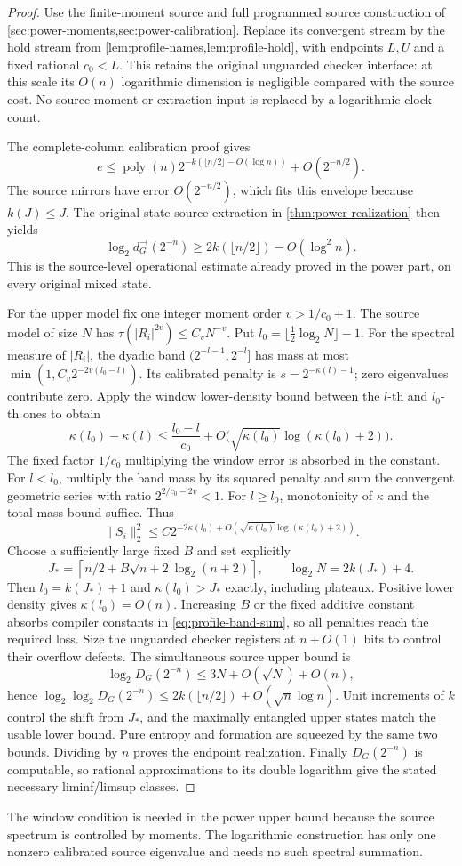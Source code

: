\begin{proof}
Use the finite-moment source and full programmed source construction of \cref{sec:power-moments,sec:power-calibration}. Replace its convergent stream by the hold stream from \cref{lem:profile-names,lem:profile-hold}, with endpoints $L,U$ and a fixed rational $c_0<L$. This retains the original unguarded checker interface: at this scale its $O(n)$ logarithmic dimension is negligible compared with the source cost. No source-moment or extraction input is replaced by a logarithmic clock count.

The complete-column calibration proof gives
\[
 e\le\operatorname{poly}(n)2^{-k(\lfloor n/2\rfloor-O(\log n))}
       +O(2^{-n/2}).
\]
The source mirrors have error $O(2^{-n/2})$, which fits this envelope because $k(J)\le J$. The original-state source extraction in \cref{thm:power-realization} then yields
\[
 \log_2d_G^\to(2^{-n})\ge2k(\lfloor n/2\rfloor)-O(\log^2n).
\]
This is the source-level operational estimate already proved in the power part, on every original mixed state.

For the upper model fix one integer moment order $v>1/c_0+1$. The source model of size $N$ has $\tau(|R_i|^{2v})\le C_vN^{-v}$. Put $l_0=\lfloor\tfrac12\log_2N\rfloor-1$. For the spectral measure of $|R_i|$, the dyadic band $(2^{-l-1},2^{-l}]$ has mass at most $\min(1,C_v2^{-2v(l_0-l)})$. Its calibrated penalty is $s=2^{-\kappa(l)-1}$; zero eigenvalues contribute zero. Apply the window lower-density bound between the $l$-th and $l_0$-th ones to obtain
\[
 \kappa(l_0)-\kappa(l)\le\frac{l_0-l}{c_0}
       +O\bigl(\sqrt{\kappa(l_0)}\log(\kappa(l_0)+2)\bigr).
\]
The fixed factor $1/c_0$ multiplying the window error is absorbed in the constant. For $l<l_0$, multiply the band mass by its squared penalty and sum the convergent geometric series with ratio $2^{2/c_0-2v}<1$. For $l\ge l_0$, monotonicity of $\kappa$ and the total mass bound suffice. Thus
\begin{equation}\label{eq:profile-band-sum}
 \|S_i\|_2^2\le C2^{-2\kappa(l_0)
       +O(\sqrt{\kappa(l_0)}\log(\kappa(l_0)+2))}.
\end{equation}
Choose a sufficiently large fixed $B$ and set explicitly
\[
 J_* =\left\lceil n/2+B\sqrt{n+2}\log_2(n+2)\right\rceil,
 \qquad \log_2N=2k(J_*)+4.
\]
Then $l_0=k(J_*)+1$ and $\kappa(l_0)>J_*$ exactly, including plateaux. Positive lower density gives $\kappa(l_0)=O(n)$. Increasing $B$ or the fixed additive constant absorbs compiler constants in \eqref{eq:profile-band-sum}, so all penalties reach the required loss. Size the unguarded checker registers at $n+O(1)$ bits to control their overflow defects. The simultaneous source upper bound is
\[
 \log_2D_G(2^{-n})\le3N+O(\sqrt N)+O(n),
\]
hence $\log_2\log_2D_G(2^{-n})\le2k(\lfloor n/2\rfloor)+O(\sqrt n\log n)$. Unit increments of $k$ control the shift from $J_*$, and the maximally entangled upper states match the usable lower bound. Pure entropy and formation are squeezed by the same two bounds. Dividing by $n$ proves the endpoint realization. Finally $D_G(2^{-n})$ is computable, so rational approximations to its double logarithm give the stated necessary liminf/limsup classes.
\end{proof}

The window condition is needed in the power upper bound because the source spectrum is controlled by moments. The logarithmic construction has only one nonzero calibrated source eigenvalue and needs no such spectral summation.
